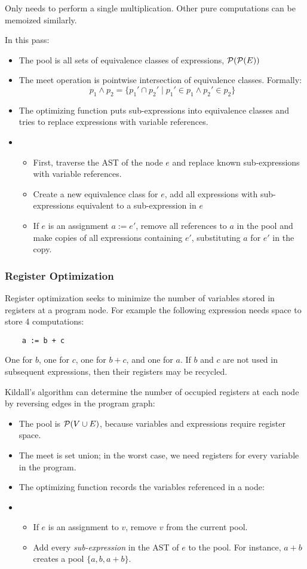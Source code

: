 \documentclass{article}
\begin{document}
Only needs to perform a single multiplication.
Other pure computations can be memoized similarly.

In this pass:
\begin{itemize}
\item The pool is all sets of equivalence classes of expressions, $\mathcal{P}(\mathcal{P}(E))$
\item The meet operation is pointwise intersection of equivalence classes. Formally:
  $$p_1 \wedge p_2 = \{ p_1' \cap p_2' \mid p_1' \in p_1 \wedge p_2' \in p_2 \}$$
\item The optimizing function puts sub-expressions into equivalence classes and tries to replace expressions with variable references.
\item[]
  \begin{itemize}
  \item First, traverse the AST of the node $e$ and replace known sub-expressions with variable references.
  \item Create a new equivalence class for $e$, add all expressions with sub-expressions equivalent to a sub-expression in $e$
  \item If $e$ is an assignment $a := e'$, remove all references to $a$ in the pool and make copies of all expressions containing $e'$, substituting $a$ for $e'$ in the copy.
  \end{itemize}
\end{itemize}

\subsubsection*{Register Optimization}
Register optimization seeks to minimize the number of variables stored in registers at a program node.
For example the following expression needs space to store 4 computations:
\begin{lstlisting}
    a := b + c
\end{lstlisting}
One for $b$, one for $c$, one for $b + c$, and one for $a$.
If $b$ and $c$ are not used in subsequent expressions, then their registers may be recycled.

Kildall's algorithm can determine the number of occupied registers at each node by reversing edges in the program graph:
\begin{itemize}
\item The pool is $\mathcal{P}(V \cup E)$, because variables and expressions require register space.
\item The meet is set union; in the worst case, we need registers for every variable in the program.
\item The optimizing function records the variables referenced in a node:
\item[]
  \begin{itemize}
  \item If $e$ is an assignment to $v$, remove $v$ from the current pool.
  \item Add every \emph{sub-expression} in the AST of $e$ to the pool.
    For instance, $a + b$ creates a pool $\{a, b, a + b\}$.
  \end{itemize}
\end{itemize}
\end{document}
